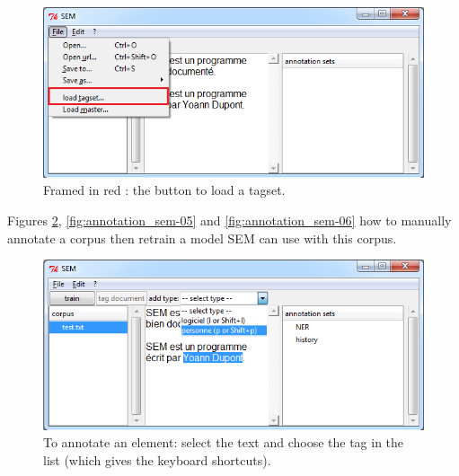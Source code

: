 \documentclass[manual-fr.tex]{subfiles}
\begin{document}
\begin{figure}[ht!]
    \begin{center}
    \includegraphics[scale=0.5]{fr/images/annotation_sem-03.png}
    \end{center}
    \caption{Framed in red : the button to load a tagset.}
    \label{fig:annotation_sem-03}
\end{figure}


Figures \ref{fig:annotation_sem-04}, \ref{fig:annotation_sem-05} and \ref{fig:annotation_sem-06} how to manually annotate a corpus then retrain a model SEM can use with this corpus.


\begin{figure}[ht!]
    \begin{center}
    \includegraphics[scale=0.5]{fr/images/annotation_sem-04.png}
    \end{center}
    \caption{To annotate an element: select the text and choose the tag in the list (which gives the keyboard shortcuts).}
    \label{fig:annotation_sem-04}
\end{figure}
\end{document}
